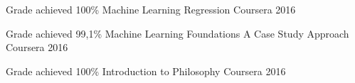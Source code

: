 \begin{cvhonors}

  \cvhonor
    {Grade achieved 100\%} %
    {Machine Learning Regression} %
    {Coursera} %
    {2016} %

  \cvhonor
    {Grade achieved 99,1\%} %
    {Machine Learning Foundations A Case Study Approach} %
    {Coursera} %
    {2016} %

  \cvhonor
    {Grade achieved 100\%} %
    {Introduction to Philosophy} %
    {Coursera} %
    {2016} %

\end{cvhonors}
